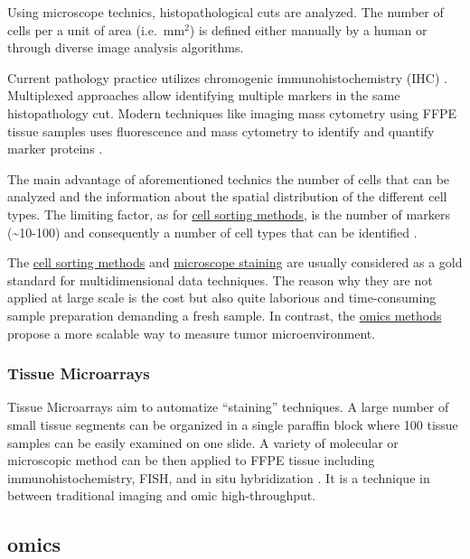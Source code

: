 \documentclass[12pt,]{book}
\theoremstyle{definition}
\theoremstyle{definition}
\theoremstyle{definition}
\theoremstyle{remark}
\begin{document}
Using microscope technics, histopathological cuts are analyzed. The
number of cells per a unit of area (i.e.~mm\(^2\)) is defined either
manually by a human or through diverse image analysis algorithms.

Current pathology practice utilizes chromogenic immunohistochemistry
(IHC) \citep{RamosVara2010}. Multiplexed approaches allow identifying
multiple markers in the same histopathology cut. Modern techniques like
imaging mass cytometry using FFPE tissue samples uses fluorescence and
mass cytometry to identify and quantify marker proteins
\citep{Giesen2014}.

The main advantage of aforementioned technics the number of cells that
can be analyzed and the information about the spatial distribution of
the different cell types. The limiting factor, as for
\protect\hyperlink{facs}{cell sorting methods}, is the number of markers
(\textasciitilde{}10-100) and consequently a number of cell types that
can be identified \citep{Schelker2017}.

The \protect\hyperlink{facs}{cell sorting methods} and
\protect\hyperlink{staining}{microscope staining} are usually considered
as a gold standard for multidimensional data techniques. The reason why
they are not applied at large scale is the cost but also quite laborious
and time-consuming sample preparation demanding a fresh sample. In
contrast, the \protect\hyperlink{omics}{omics methods} propose a more
scalable way to measure tumor microenvironment.

\hypertarget{tissue-microarrays}{%
\subsubsection{Tissue Microarrays}\label{tissue-microarrays}}

Tissue Microarrays aim to automatize ``staining'' techniques. A large
number of small tissue segments can be organized in a single paraffin
block where 100 tissue samples can be easily examined on one slide. A
variety of molecular or microscopic method can be then applied to FFPE
tissue including immunohistochemistry, FISH, and in situ hybridization
\citep{Wilczynski2009}. It is a technique in between traditional imaging
and omic high-throughput.

\hypertarget{omics}{%
\subsection{omics}\label{omics}}
\end{document}
